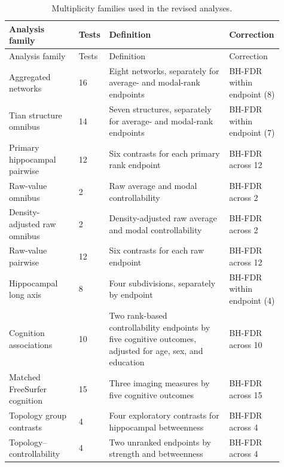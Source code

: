\documentclass{article}
\providecommand{\DIFaddtex}[1]{{\protect\color{blue}#1}} %
\providecommand{\DIFadd}[1]{\texorpdfstring{\DIFaddtex{#1}}{#1}} %
\begin{document}
\begin{landscape}
\begin{longtable}{p{0.25\linewidth}p{0.08\linewidth}p{0.43\linewidth}p{0.15\linewidth}}
\caption{\DIFadd{Multiplicity families used in the revised analyses.}}\label{tab:multiplicity_families}\\
\toprule \DIFadd{Analysis family }& \DIFadd{Tests }& \DIFadd{Definition }& \DIFadd{Correction}\\ \midrule
\endfirsthead
\toprule \DIFadd{Analysis family }& \DIFadd{Tests }& \DIFadd{Definition }& \DIFadd{Correction}\\ \midrule
\endhead
\DIFadd{Aggregated networks }& \DIFadd{16 }& \DIFadd{Eight networks, separately for average- and modal-rank endpoints }& \DIFadd{BH-FDR within endpoint (8)}\\
\DIFadd{Tian structure omnibus }& \DIFadd{14 }& \DIFadd{Seven structures, separately for average- and modal-rank endpoints }& \DIFadd{BH-FDR within endpoint (7)}\\
\DIFadd{Primary hippocampal pairwise }& \DIFadd{12 }& \DIFadd{Six contrasts for each primary rank endpoint }& \DIFadd{BH-FDR across 12}\\
\DIFadd{Raw-value omnibus }& \DIFadd{2 }& \DIFadd{Raw average and modal controllability }& \DIFadd{BH-FDR across 2}\\
\DIFadd{Density-adjusted raw omnibus }& \DIFadd{2 }& \DIFadd{Density-adjusted raw average and modal controllability }& \DIFadd{BH-FDR across 2}\\
\DIFadd{Raw-value pairwise }& \DIFadd{12 }& \DIFadd{Six contrasts for each raw endpoint }& \DIFadd{BH-FDR across 12}\\
\DIFadd{Hippocampal long axis }& \DIFadd{8 }& \DIFadd{Four subdivisions, separately by endpoint }& \DIFadd{BH-FDR within endpoint (4)}\\
\DIFadd{Cognition associations }& \DIFadd{10 }& \DIFadd{Two rank-based controllability endpoints by five cognitive outcomes, adjusted for age, sex, and education }& \DIFadd{BH-FDR across 10}\\
\DIFadd{Matched FreeSurfer cognition }& \DIFadd{15 }& \DIFadd{Three imaging measures by five cognitive outcomes }& \DIFadd{BH-FDR across 15}\\
\DIFadd{Topology group contrasts }& \DIFadd{4 }& \DIFadd{Four exploratory contrasts for hippocampal betweenness }& \DIFadd{BH-FDR across 4}\\
\DIFadd{Topology--controllability }& \DIFadd{4 }& \DIFadd{Two unranked endpoints by strength and betweenness }& \DIFadd{BH-FDR across 4}\\

\end{longtable}
\end{landscape}
\end{document}
